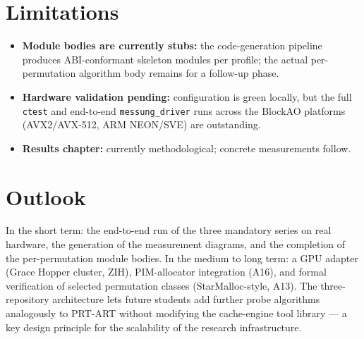 \section{Limitations}\label{sec:limitations}

\begin{itemize}
  \item \textbf{Module bodies are currently stubs:} the code-generation pipeline produces
        ABI-conformant skeleton modules per profile; the actual per-permutation algorithm
        body remains for a follow-up phase.
  \item \textbf{Hardware validation pending:} configuration is green locally, but the full
        \texttt{ctest} and end-to-end \texttt{messung\_driver} runs across the BlockAO
        platforms (AVX2/AVX-512, ARM NEON/SVE) are outstanding.
  \item \textbf{Results chapter:} currently methodological; concrete measurements follow.
\end{itemize}

\section{Outlook}\label{sec:outlook}

In the short term: the end-to-end run of the three mandatory series on real hardware, the
generation of the measurement diagrams, and the completion of the per-permutation module
bodies. In the medium to long term: a GPU adapter (Grace Hopper cluster, ZIH), PIM-allocator
integration (A16), and formal verification of selected permutation classes
(StarMalloc-style, A13). The three-repository architecture lets future students add further
probe algorithms analogously to PRT-ART without modifying the cache-engine tool library ---
a key design principle for the scalability of the research infrastructure.
